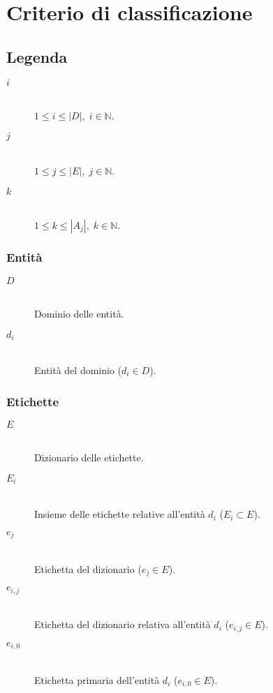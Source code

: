 \chapter{Criterio di classificazione}
\label{ch:appendice:classificazione}

\section*{Legenda}

\begin{description}
	\item[$i$] \hfill \\
	$1 \leq i \leq \left|D\right|,\; i \in \mathbb{N}$.
	\item[$j$] \hfill \\
	$1 \leq j \leq \left|E\right|,\; j \in \mathbb{N}$.
	\item[$k$] \hfill \\
	$1 \leq k \leq \left|A_j\right|,\; k \in \mathbb{N}$.
\end{description}

\subsection*{Entità}
\begin{description}
	\item[$D$] \hfill \\
	Dominio delle entità.
	\item[$d_i$] \hfill \\
	Entità del dominio ($d_i \in D$).
\end{description}	

\subsection*{Etichette}
\begin{description}
	\item[$E$] \hfill \\
	Dizionario delle etichette.
	\item[$E_i$] \hfill \\
	Insieme delle etichette relative all'entità $d_i$ ($E_i \subset E$).
	\item[$e_j$] \hfill \\
	Etichetta del dizionario ($e_j \in E$).
	\item[$e_{i,j}$] \hfill \\
	Etichetta del dizionario relativa all'entità $d_i$ ($e_{i,j} \in E$).
	\item[$e_{i,0}$] \hfill \\
	Etichetta primaria dell'entità $d_i$ ($e_{i,0} \in E$).
\end{description}

